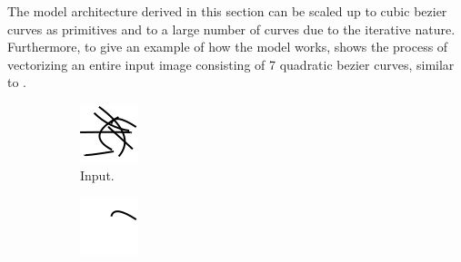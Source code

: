 The model architecture derived in this section can be scaled up to cubic bezier curves as primitives and to a large number of curves due to the iterative nature. Furthermore, to give an example of how the model works,  shows the process of vectorizing an entire input image consisting of 7 quadratic bezier curves, similar to .

\begin{figure}
    \centering
    \begin{subfigure}{.1\textwidth}
        \includegraphics[width=\textwidth]{graphics/work-artifacts/marked/full/3/test.png}
        \caption{Input.}
    \end{subfigure}
    \begin{subfigure}{.1\textwidth}
        \includegraphics[width=\textwidth]{graphics/work-artifacts/marked/full/3/test-0.png}

\end{subfigure}
\end{figure}
